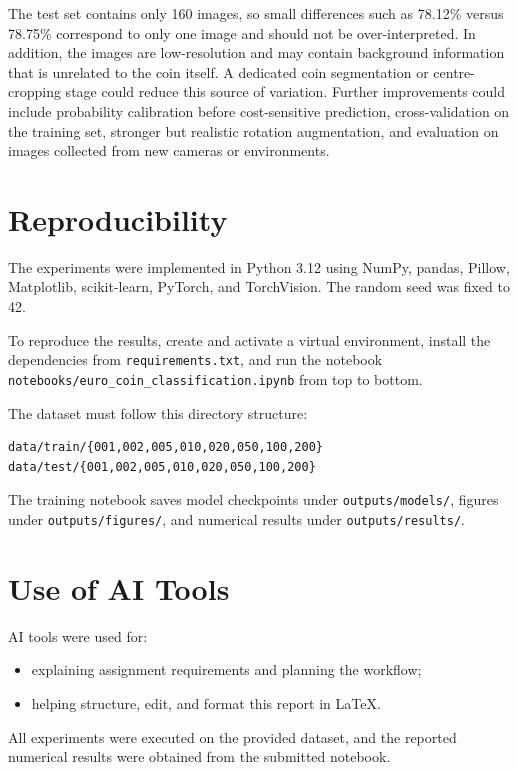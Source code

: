 \documentclass[10pt,a4paper]{article}
\begin{document}
The test set contains only 160 images, so small differences such as 78.12\% versus 78.75\% correspond
to only one image and should not be over-interpreted. In addition, the images are low-resolution and
may contain background information that is unrelated to the coin itself. A dedicated coin
segmentation or centre-cropping stage could reduce this source of variation. Further improvements
could include probability calibration before cost-sensitive prediction, cross-validation on the
training set, stronger but realistic rotation augmentation, and evaluation on images collected from
new cameras or environments.

\section{Reproducibility}

The experiments were implemented in Python 3.12 using NumPy, pandas, Pillow,
Matplotlib, scikit-learn, PyTorch, and TorchVision. The random seed was fixed to 42.

To reproduce the results, create and activate a virtual environment, install the
dependencies from \texttt{requirements.txt}, and run the notebook
\texttt{notebooks/euro\_coin\_classification.ipynb} from top to bottom.

The dataset must follow this directory structure:
\begin{verbatim}
data/train/{001,002,005,010,020,050,100,200}
data/test/{001,002,005,010,020,050,100,200}
\end{verbatim}

The training notebook saves model checkpoints under \texttt{outputs/models/},
figures under \texttt{outputs/figures/}, and numerical results under
\texttt{outputs/results/}.

\section{Use of AI Tools}

AI tools were used for:
\begin{itemize}
    \item explaining assignment requirements and planning the workflow;
    \item helping structure, edit, and format this report in \LaTeX.
\end{itemize}
All experiments were executed on the provided dataset, and the reported numerical results were
obtained from the submitted notebook.
\end{document}
